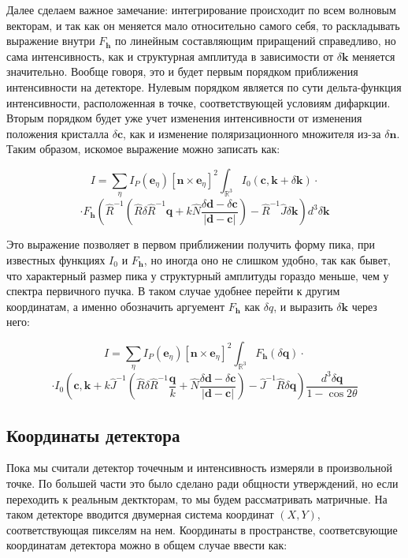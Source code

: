 \documentclass[12pt]{article}
\begin{document}
Далее сделаем важное замечание: интегрирование происходит по всем волновым векторам,
и так как он меняется мало относительно самого себя, то раскладывать выражение внутри
$F_{\pmb{h}}$ по линейным составляющим приращений справедливо, но сама интенсивность,
как и структурная амплитуда в зависимости от $\delta \pmb{k}$ меняется значительно.
Вообще говоря, это и будет первым порядком приближения интенсивности на детекторе.
Нулевым порядком является по сути дельта-функция интенсивности, расположенная
в точке, соответствующей условиям дифаркции. Вторым порядком будет уже учет
изменения интенсивности от изменения положения кристалла $\delta \pmb{c}$, 
как и изменение поляризационного множителя из-за $\delta \pmb{n}$. Таким образом,
искомое выражение можно записать как:

\[ I = \sum_\eta I_P(\pmb{e}_\eta) \left[ \pmb{n} \times \pmb{e}_\eta \right]^2
\int_{\mathbb{R}^3} I_0(\pmb{c}, \pmb{k} + \delta \pmb{k}) \cdot \]
\[ \cdot F_{\pmb{h}}\left(\hat{R}^{-1} \left(\hat{R} \delta \hat{R}^{-1} \pmb{q} +
k \hat{N} \frac{\delta \pmb{d} - \delta \pmb{c}}{|\pmb{d} - \pmb{c}|}\right) -
\hat{R}^{-1} \hat{J} \delta \pmb{k}\right) d^3 \delta \pmb{k}\]

Это выражение позволяет в первом приближении получить форму пика, при известных
функциях $I_0$ и $F_{\pmb{h}}$, но иногда оно не слишком удобно, так как
бывет, что характерный размер пика у структурный амплитуды гораздо меньше, чем у
спектра первичного пучка. В таком случае удобнее перейти к другим
координатам, а именно обозначить аргуемент $F_{\pmb{h}}$ как $\delta q$, и
выразить $\delta \pmb{k}$ через него:

\[ I = \sum_\eta I_P(\pmb{e}_\eta) \left[ \pmb{n} \times \pmb{e}_\eta \right]^2
\int_{\mathbb{R}^3} F_{\pmb{h}}(\delta \pmb{q}) \cdot \]
\[ \cdot I_0\left(\pmb{c}, \pmb{k} + k \hat{J}^{-1}\left(\hat{R} \delta \hat{R}^{-1} \frac{\pmb{q}}{k} +
\hat{N}\frac{\delta \pmb{d} - \delta \pmb{c}}{|\pmb{d} - \pmb{c}|} \right) -
\hat{J}^{-1} \hat{R} \delta \pmb{q}\right) \frac{d^3 \delta \pmb{q}}{1 - \cos{2\theta}} \]

\subsection*{Координаты детектора}

Пока мы считали детектор точечным и интенсивность измеряли в
произвольной точке. По большей части это было сделано ради общности утверждений,
но если переходить к реальным декткторам, то мы будем рассматривать матричные. На
таком детекторе вводится двумерная система координат $(X, Y)$, соответствующая
пикселям на нем. Координаты в пространстве, соответсвующие координатам детектора
можно в общем случае ввести как:
\end{document}
